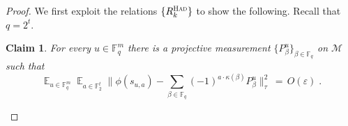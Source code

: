\documentclass[11pt]{article}
\newtheorem{claim}[theorem]{Claim}
\theoremstyle{definition}
\newcommand{\Id}{\ensuremath{I}}
\DeclareMathOperator*{\Expectation}{\mathbb{E}}
\newcommand{\Es}[1]{\Expectation_{#1}}
\newcommand{\F}{\ensuremath{\mathbb{F}}}
\newcommand{\sq}{\textsc{sq}}
\newcommand{\mM}{\ensuremath{\mathcal{M}}}
\newcommand{\had}{\textsc{Had}}
\newcommand{\eps}{\varepsilon}
\DeclareMathOperator{\sgn}{sgn}
\begin{document}
\begin{proof}

We first exploit the relations $\{R^\had_k\}$ to show the following. Recall that $q=2^t$.

\begin{claim}\label{claim:z2-stab-2}
For every $u\in \F_q^m$ there is a projective measurement $\{P^u_\beta\}_{\beta\in \F_{q}}$ on $\mM$ such that 
\begin{equation}\label{eq:z2-stab-2}
 \Es{u\in \F_q^m} \Es{a\in \F_2^t} \Big\| \phi(s_{u,a}) - \sum_{\beta\in\F_q} (-1)^{a \cdot \kappa(\beta)} P^u_\beta \Big\|_\tau^2 \,=\, O(\eps)\;. 
\end{equation}
\end{claim}


\end{proof}
\end{document}
